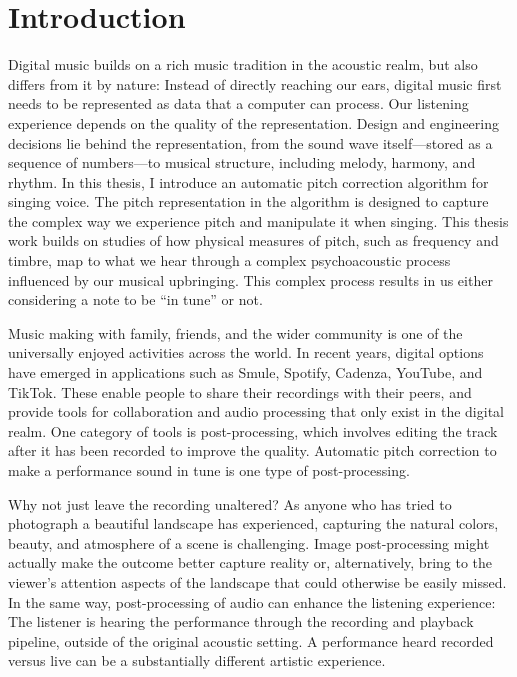 \chapter{Introduction}
\label{chap:thesis-intro}

Digital music builds on a rich music tradition in the acoustic realm, but also differs from it by nature: Instead of directly reaching our ears, digital music first needs to be represented as data that a computer can process. Our listening experience depends on the quality of the representation. Design and engineering decisions lie behind the representation, from the sound wave itself---stored as a sequence of numbers---to musical structure, including melody, harmony, and rhythm. In this thesis, I introduce an automatic pitch correction algorithm for singing voice. The pitch representation in the algorithm is designed to capture the complex way we experience pitch and manipulate it when singing. This thesis work builds on studies of how physical measures of pitch, such as frequency and timbre, map to what we hear through a complex psychoacoustic process influenced by our musical upbringing. This complex process results in us either considering a note to be ``in tune'' or not.

Music making with family, friends, and the wider community is one of the universally enjoyed activities across the world. In recent years, digital options have emerged in applications such as Smule, Spotify, Cadenza, YouTube, and TikTok. These enable people to share their recordings with their peers, and provide tools for collaboration and audio processing that only exist in the digital realm. One category of tools is post-processing, which involves editing the track after it has been recorded to improve the quality. Automatic pitch correction to make a performance sound in tune is one type of post-processing. 

Why not just leave the recording unaltered? As anyone who has tried to photograph a beautiful landscape has experienced, capturing the natural colors, beauty, and atmosphere of a scene is challenging. Image post-processing might actually make the outcome better capture reality or, alternatively, bring to the viewer's attention aspects of the landscape that could otherwise be easily missed. In the same way, post-processing of audio can enhance the listening experience: The listener is hearing the performance through the recording and playback pipeline, outside of the original acoustic setting. A performance heard recorded versus live can be a substantially different artistic experience.

